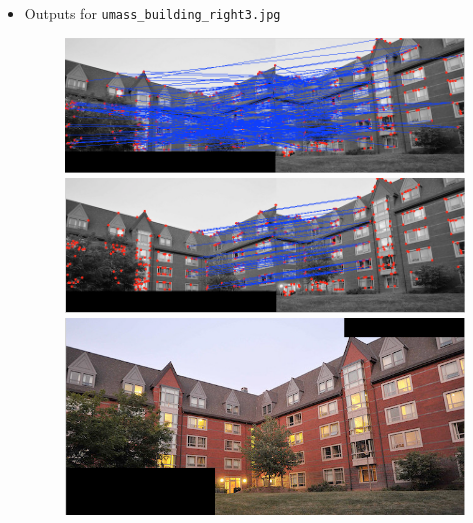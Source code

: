 \documentclass[10pt,letterpaper]{article}
\newcommand{\cmd}[1] {{\color{blue}\texttt{#1}}}
\begin{document}
\begin{itemize}
\item Outputs for \cmd{umass\_building\_right3.jpg}
\begin{figure}[h]
\centering
\includegraphics[width=0.9\linewidth]{../latex/allmatches.png} \\
\includegraphics[width=0.9\linewidth]{../latex/inliers.png} \\
\includegraphics[width=0.9\linewidth]{../latex/result.png} \\
\end{figure}
\newpage


\end{itemize}
\end{document}
